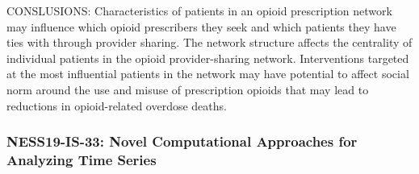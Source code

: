\begin{itemize}
CONSLUSIONS: Characteristics of patients in an opioid prescription network may influence which opioid prescribers they seek and which patients they have ties with through provider sharing. The network structure affects the centrality of individual patients in the opioid provider-sharing network. Interventions targeted at the most influential patients in the network may have potential to affect social norm around the use and misuse of prescription opioids that may lead to reductions in opioid-related overdose deaths. 


\end{itemize}

\subsubsection*{NESS19-IS-33: Novel Computational Approaches for Analyzing Time Series}

